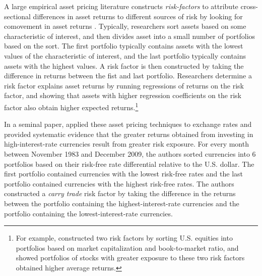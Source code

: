 \documentclass{ar-1col}
\begin{document}
A large empirical asset pricing literature constructs \emph{risk-factors} to 
attribute cross-sectional differences in asset returns to different sources 
of risk by looking for comovement in asset returns \citep{Fama1976}. Typically, 
researchers sort assets based on some characteristic of interest, and then 
divides asset into a small number of portfolios based on the sort. The first 
portfolio typically contains assets with the lowest values of the characteristic of 
interest, and the last portfolio typically contains assets with the highest 
values. A risk factor is then constructed by taking the difference in returns 
between the fist and last portfolio. Researchers determine a risk factor 
explains asset returns by running regressions of returns on the risk factor, and 
showing that assets with higher regression coefficients on the risk factor also 
obtain higher expected returns.\footnote{For example, \citet{FamaFrench1992} 
constructed two risk factors by sorting U.S. equities into portfolios based on 
market capitalization and book-to-market ratio, and showed portfolios of stocks
with greater exposure to these two risk factors obtained higher average returns.}


In a seminal paper, \citet{LustigRoussanovVerdelhan2011} applied these asset
pricing techniques to exchange rates and provided systematic evidence that 
the greater returns obtained from investing in high-interest-rate currencies 
result from greater risk exposure. For every month between November 1983 and 
December 2009, the authors sorted currencies into 6 portfolios based 
on their risk-free rate differential relative to the U.S. dollar. The first 
portfolio contained currencies with the lowest risk-free rates and the 
last portfolio contained currencies with the highest risk-free rates. The 
authors constructed a \emph{carry trade} risk factor by taking the difference 
in the returns between the portfolio containing the highest-interest-rate 
currencies and the portfolio containing the lowest-interest-rate currencies.
\end{document}
